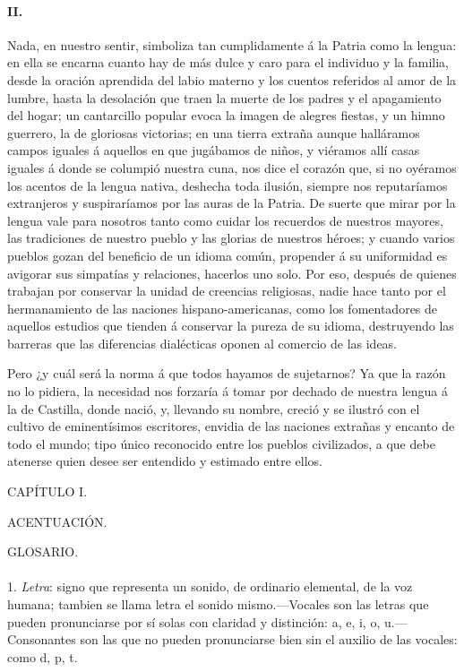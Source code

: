 \documentclass{book}
\begin{document}
\paragraph{II.}

Nada, en nuestro sentir, simboliza tan cumplidamente á la Patria como la lengua: en ella se 
encarna cuanto hay de más dulce y caro para el individuo y la familia, desde la oración 
aprendida del labio materno y los cuentos referidos al amor de la lumbre, hasta la desolación 
que traen la muerte de los padres y el apagamiento del hogar; un cantarcillo popular evoca la 
imagen de alegres fiestas, y un himno guerrero, la de gloriosas victorias; en una tierra 
extraña aunque halláramos campos iguales á aquellos en que jugábamos de niños, y viéramos allí 
casas iguales á donde se columpió nuestra cuna, nos dice el corazón que, si no oyéramos los 
acentos de la lengua nativa, deshecha toda ilusión, siempre nos reputaríamos extranjeros y 
suspiraríamos por las auras de la Patria. De suerte que mirar por la lengua vale para nosotros 
tanto como cuidar los recuerdos de nuestros mayores, las tradiciones de nuestro pueblo y las 
glorias de nuestros héroes; y cuando varios pueblos gozan del beneficio de un idioma común, 
propender á su uniformidad es avigorar sus simpatías y relaciones, hacerlos uno solo. Por eso, 
después de quienes trabajan por conservar la unidad de creencias religiosas, nadie hace tanto 
por el hermanamiento de las naciones hispano-americanas, como los fomentadores de aquellos 
estudios que tienden á conservar la pureza de su idioma, destruyendo las barreras que las 
diferencias dialécticas oponen al comercio de las ideas. 

Pero ¿y cuál será la norma á que todos hayamos de sujetarnos? Ya que la razón no lo pidiera, la 
necesidad nos forzaría á tomar por dechado de nuestra lengua á la de Castilla, donde nació, y, 
llevando su nombre, creció y se ilustró con el cultivo de eminentísimos escritores, envidia de 
las naciones extrañas y encanto de todo el mundo; tipo único reconocido entre los pueblos 
civilizados, a que debe atenerse quien desee ser entendido y estimado entre ellos.

CAPÍTULO I.

ACENTUACIÓN.

GLOSARIO.

\small

\paragraph{} 1. \emph{Letra}: signo que representa un sonido, de ordinario elemental, de la voz humana; 
tambien se llama letra el sonido mismo.---Vocales son las letras que pueden pronunciarse por sí solas con 
claridad y distinción: a, e, i, o, u.---Consonantes son las que no pueden pronunciarse bien sin el 
auxilio de las vocales: como d, p, t.
\end{document}
